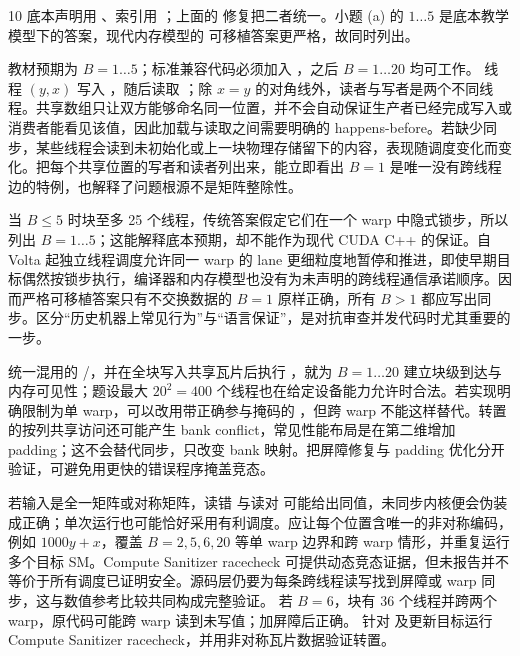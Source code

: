 \begin{solutionexercise}{10}
\editorialnote 底本声明用 、索引用 ；上面的
修复把二者统一。小题 (a) 的 $1\ldots5$ 是底本教学模型下的答案，现代内存模型的
可移植答案更严格，故同时列出。

\conclusionheading 教材预期为 $B=1\ldots5$；标准兼容代码必须加入
，之后 $B=1\ldots20$ 均可工作。
\discussionheading
{}
线程 $(y,x)$ 写入 ，随后读取 ；除 $x=y$ 的对角线外，读者与写者是两个不同线程。共享数组只让双方能够命名同一位置，并不会自动保证生产者已经完成写入或消费者能看见该值，因此加载与读取之间需要明确的 happens-before。若缺少同步，某些线程会读到未初始化或上一块物理存储留下的内容，表现随调度变化而变化。把每个共享位置的写者和读者列出来，能立即看出 $B=1$ 是唯一没有跨线程边的特例，也解释了问题根源不是矩阵整除性。

当 $B\le5$ 时块至多 25 个线程，传统答案假定它们在一个 warp 中隐式锁步，所以列出 $B=1\ldots5$；这能解释底本预期，却不能作为现代 CUDA C++ 的保证。自 Volta 起独立线程调度允许同一 warp 的 lane 更细粒度地暂停和推进，即使早期目标偶然按锁步执行，编译器和内存模型也没有为未声明的跨线程通信承诺顺序。因而严格可移植答案只有不交换数据的 $B=1$ 原样正确，所有 $B>1$ 都应写出同步。区分“历史机器上常见行为”与“语言保证”，是对抗审查并发代码时尤其重要的一步。

统一混用的 /，并在全块写入共享瓦片后执行 ，就为 $B=1\ldots20$ 建立块级到达与内存可见性；题设最大 $20^2=400$ 个线程也在给定设备能力允许时合法。若实现明确限制为单 warp，可以改用带正确参与掩码的 ，但跨 warp 不能这样替代。转置的按列共享访问还可能产生 bank conflict，常见性能布局是在第二维增加 padding；这不会替代同步，只改变 bank 映射。把屏障修复与 padding 优化分开验证，可避免用更快的错误程序掩盖竞态。

若输入是全一矩阵或对称矩阵，读错  与读对  可能给出同值，未同步内核便会伪装成正确；单次运行也可能恰好采用有利调度。应让每个位置含唯一的非对称编码，例如 $1000y+x$，覆盖 $B=2,5,6,20$ 等单 warp 边界和跨 warp 情形，并重复运行多个目标 SM。Compute Sanitizer racecheck 可提供动态竞态证据，但未报告并不等价于所有调度已证明安全。源码层仍要为每条跨线程读写找到屏障或 warp 同步，这与数值参考比较共同构成完整验证。
\variantheading 若 $B=6$，块有 36 个线程并跨两个 warp，原代码可能跨 warp 读到未写值；加屏障后正确。
\practiceheading 针对  及更新目标运行 Compute Sanitizer racecheck，并用非对称瓦片数据验证转置。
\end{solutionexercise}


